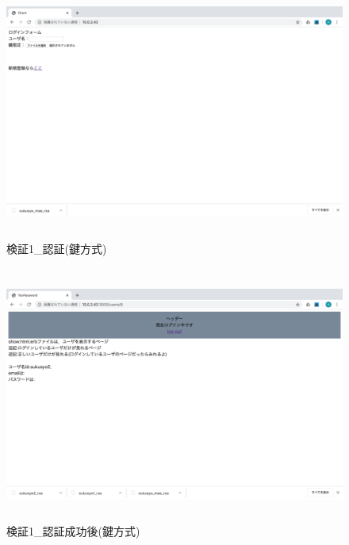     \vspace{4cm}%
    \begin{figure}[H]
        \includegraphics[height=8.4cm]{./fig/chapter4/inspect_1/key_screnn/login.png}
        \caption{検証1\_認証(鍵方式)}
        \label{検証１認証(鍵方式)}
    \end{figure}

    \vspace{4cm}%
    \begin{figure}[H]
        \includegraphics[height=8.4cm]{./fig/chapter4/inspect_1/key_screnn/login-after2.png}
        \caption{検証1\_認証成功後(鍵方式)}
        \label{検証１認証成功後(鍵方式)}
    \end{figure}





    

